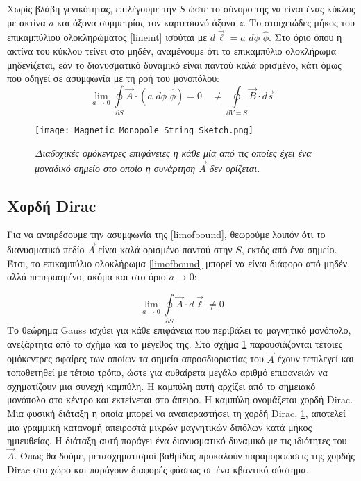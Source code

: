 Χωρίς βλάβη γενικότητας, επιλέγουμε την $S$ ώστε το σύνορο της να είναι ένας κύκλος με ακτίνα $a$ και άξονα συμμετρίας τον καρτεσιανό άξονα $z$. Το στοιχειώδες μήκος του επικαμπύλιου ολοκληρώματος \eqref{lineint} ισούται με $d\Vec{\ell} = a \,\, d\phi \,\, \hat{\phi}$. Στο όριο όπου η ακτίνα του κύκλου τείνει στο μηδέν, αναμένουμε ότι το επικαμπύλιο ολοκλήρωμα μηδενίζεται, εάν το διανυσματικό δυναμικό είναι παντού καλά ορισμένο, κάτι όμως που οδηγεί σε ασυμφωνία με τη ροή του μονοπόλου:
\begin{equation}\label{limofbound}
    \lim\limits_{a\rightarrow0}\oint\limits_{\partial S} \Vec{A} \cdot \left(  a \,\, d\phi \,\, \hat{\phi} \right) = 0 \quad \ne \oint\limits_{\partial V = S} \Vec{B} \cdot d\Vec{s} 
\end{equation}

\begin{figure}[t]
            \centering
            \texttt{[image: Magnetic Monopole String Sketch.png]}
            \caption{\textit{Διαδοχικές ομόκεντρες επιφάνειες η κάθε μία από τις οποίες έχει ένα μοναδικό σημείο στο οποίο η συνάρτηση $\vec{A}$ δεν ορίζεται.}}
    \label{fig:diracstr}
\end{figure}
\subsection{Χορδή Dirac}
Για να αναιρέσουμε την ασυμφωνία της \eqref{limofbound}, θεωρούμε λοιπόν ότι το διανυσματικό πεδίο $\vec{A}$ είναι καλά ορισμένο παντού στην $S$, εκτός από ένα σημείο. Έτσι, το επικαμπύλιο ολοκλήρωμα \eqref{limofbound} μπορεί να είναι διάφορο από μηδέν, αλλά πεπερασμένο, ακόμα και στο όριο $a \rightarrow 0$:

\begin{equation*}
            \lim\limits_{a\rightarrow0}\oint\limits_{\partial S} \vec{A} \cdot d\vec{\ell} \ne 0
\end{equation*}
Το θεώρημα Gauss ισχύει για κάθε επιφάνεια που περιβάλει το μαγνητικό μονόπολο, ανεξάρτητα από το σχήμα και το μέγεθος της. Στο σχήμα \ref{fig:diracstr} παρουσιάζονται τέτοιες ομόκεντρες σφαίρες των οποίων τα σημεία απροσδιοριστίας του $\vec{A}$ έχουν τεπιλεγεί και τοποθετηθεί με τέτοιο τρόπο, ώστε για αυθαίρετα μεγάλο αριθμό επιφανειών να σχηματίζουν μια συνεχή καμπύλη. Η καμπύλη αυτή αρχίζει από το σημειακό μονόπολο στο κέντρο και εκτείνεται στο άπειρο. Η καμπύλη ονομάζεται χορδή Dirac. 
Μια φυσική διάταξη η οποία μπορεί να αναπαραστήσει τη χορδή Dirac, \ref{fig:diracstr}, αποτελεί μια γραμμική κατανομή απειροστά μικρών μαγνητικών διπόλων κατά μήκος ημιευθείας. Η διάταξη αυτή παράγει ένα διανυσματικό δυναμικό με τις ιδιότητες του $\vec{A}$. 
Όπως θα δούμε, μετασχηματισμοί βαθμίδας προκαλούν παραμορφώσεις της χορδής Dirac στο χώρο και παράγουν διαφορές φάσεως σε ένα κβαντικό σύστημα.

